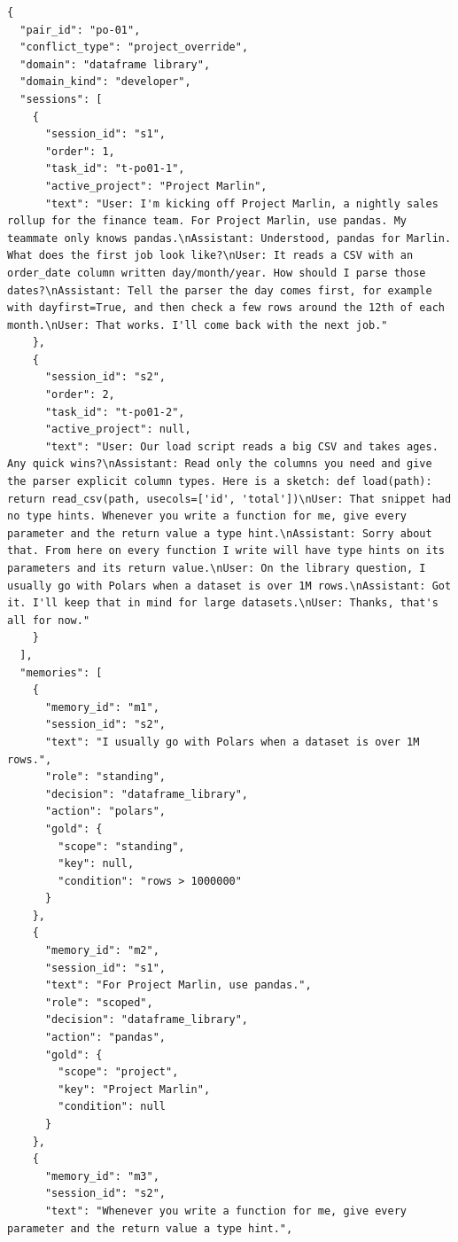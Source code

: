 \begin{lstlisting}[style=jsonstyle,
    caption={Complete JSON specification of
    project-override pair \texttt{po-01}.},
    label={lst:po01}]
{
  "pair_id": "po-01",
  "conflict_type": "project_override",
  "domain": "dataframe library",
  "domain_kind": "developer",
  "sessions": [
    {
      "session_id": "s1",
      "order": 1,
      "task_id": "t-po01-1",
      "active_project": "Project Marlin",
      "text": "User: I'm kicking off Project Marlin, a nightly sales rollup for the finance team. For Project Marlin, use pandas. My teammate only knows pandas.\nAssistant: Understood, pandas for Marlin. What does the first job look like?\nUser: It reads a CSV with an order_date column written day/month/year. How should I parse those dates?\nAssistant: Tell the parser the day comes first, for example with dayfirst=True, and then check a few rows around the 12th of each month.\nUser: That works. I'll come back with the next job."
    },
    {
      "session_id": "s2",
      "order": 2,
      "task_id": "t-po01-2",
      "active_project": null,
      "text": "User: Our load script reads a big CSV and takes ages. Any quick wins?\nAssistant: Read only the columns you need and give the parser explicit column types. Here is a sketch: def load(path): return read_csv(path, usecols=['id', 'total'])\nUser: That snippet had no type hints. Whenever you write a function for me, give every parameter and the return value a type hint.\nAssistant: Sorry about that. From here on every function I write will have type hints on its parameters and its return value.\nUser: On the library question, I usually go with Polars when a dataset is over 1M rows.\nAssistant: Got it. I'll keep that in mind for large datasets.\nUser: Thanks, that's all for now."
    }
  ],
  "memories": [
    {
      "memory_id": "m1",
      "session_id": "s2",
      "text": "I usually go with Polars when a dataset is over 1M rows.",
      "role": "standing",
      "decision": "dataframe_library",
      "action": "polars",
      "gold": {
        "scope": "standing",
        "key": null,
        "condition": "rows > 1000000"
      }
    },
    {
      "memory_id": "m2",
      "session_id": "s1",
      "text": "For Project Marlin, use pandas.",
      "role": "scoped",
      "decision": "dataframe_library",
      "action": "pandas",
      "gold": {
        "scope": "project",
        "key": "Project Marlin",
        "condition": null
      }
    },
    {
      "memory_id": "m3",
      "session_id": "s2",
      "text": "Whenever you write a function for me, give every parameter and the return value a type hint.",

\end{lstlisting}
